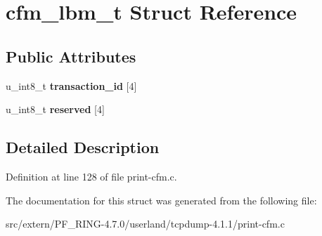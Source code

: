 \hypertarget{structcfm__lbm__t}{
\section{cfm\_\-lbm\_\-t Struct Reference}
\label{structcfm__lbm__t}
}
\subsection*{Public Attributes}
\begin{DoxyCompactItemize}
\item 
\hypertarget{structcfm__lbm__t_a4018c023e16375407144ab618901cc5d}{
u\_\-int8\_\-t {\bfseries transaction\_\-id} \mbox{[}4\mbox{]}}
\label{structcfm__lbm__t_a4018c023e16375407144ab618901cc5d}

\item 
\hypertarget{structcfm__lbm__t_ab3a136aada0763d10c4dbb944981dafa}{
u\_\-int8\_\-t {\bfseries reserved} \mbox{[}4\mbox{]}}
\label{structcfm__lbm__t_ab3a136aada0763d10c4dbb944981dafa}

\end{DoxyCompactItemize}


\subsection{Detailed Description}


Definition at line 128 of file print-\/cfm.c.



The documentation for this struct was generated from the following file:\begin{DoxyCompactItemize}
\item 
src/extern/PF\_\-RING-\/4.7.0/userland/tcpdump-\/4.1.1/print-\/cfm.c\end{DoxyCompactItemize}
